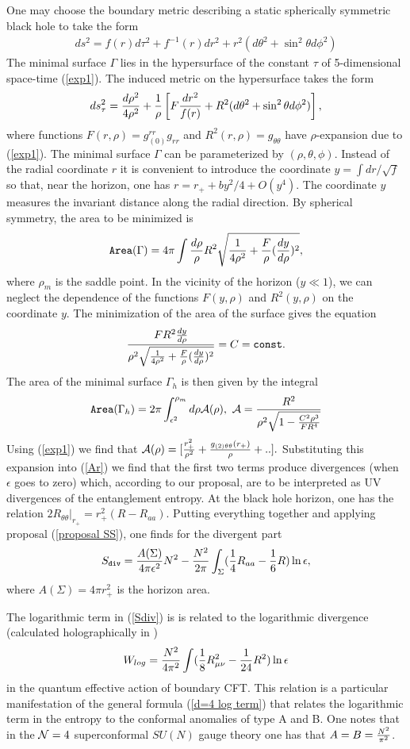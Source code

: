 \documentclass[12pt]{article}
\def\r{\rho}
\def\be{\begin{eqnarray}}
\def\ee{\end{eqnarray}}
\def\lb{\label}
\def\o{\over}
\begin{document}
One may choose the
boundary metric  describing
 a static spherically symmetric black hole to take the form
\be ds^2=f(r)d\tau^2+f^{-1}(r)dr^2+r^2(d\theta^2+\sin^2\theta
d\phi^2) \lb{spher} 
\ee 
The minimal surface $\Gamma$ lies in the
hypersurface of the constant $\tau$ of 5-dimensional space-time
(\ref{exp1}).
 The induced metric on the hypersurface takes the form
\be ds^2_{\tau}={d\r^2\over 4\r^2}+{1\over \r}\left[F{dr^2\over
f(r)} +R^2(d\theta^2+\sin^2\theta d\phi^2)\right], \lb{hyper} 
\ee
where functions $F(r,\rho)=g^{rr}_{(0)}g_{rr}$ and
$R^2(r,\rho)=g_{\theta\theta}$ have $\rho$-expansion due to
(\ref{exp1}). The minimal surface $\Gamma$ can be parameterized by
$(\rho, \theta, \phi)$. Instead of the radial coordinate $r$ it is
convenient to introduce the coordinate $y=\int dr/\sqrt{f}$ so that,
near the horizon, one has $r=r_++by^2/4+O(y^4)$. The coordinate $y$ measures the
invariant distance along the radial direction. By spherical
symmetry, the area to be minimized is 
\be {\tt Area}(\Gamma)=4\pi
\int {d\r \over \r}R^2 \sqrt{{1\over 4\r^2}+{F\over \r} ({dy\over
d\r})^2}, \lb{*} 
\ee 
where $\r_m$ is  the saddle
point. In the  vicinity of the horizon ($y\ll 1$), we can
neglect the dependence of the functions $F(y,\r)$ and $R^2(y,\rho)$ on the 
coordinate $y$. The minimization of the area of the surface gives
the equation 
\be {FR^2{dy\over d\r}\over \r^2\sqrt{{1\over
4\r^2}+{F\over \r} ({dy\over d\r})^2}}=C={\tt const}. \lb{**} 
\ee
The area of the minimal surface $\Gamma_h$  is then given by the
integral 
\be {\tt Area}(\Gamma_h)=2\pi
\int_{\epsilon^2}^{\r_m}d\r{\cal A} (\r),~{\cal A} ={R^2\over
\r^2\sqrt{1-{C^2\r^3\over FR^4}}} \lb{Ar} 
\ee 
Using (\ref{exp1})
we find that $ {\cal A} (\r)=[{r^2_+\over
\r^2}+{g_{(2)\theta\theta}(r_+)\over \r}+..]. $ Substituting this
expansion into (\ref{Ar}) we find that the first two terms produce
divergences (when $\epsilon$ goes to zero)  which, according to
our proposal, are to be interpreted as UV divergences of the
entanglement entropy. At the black hole horizon, one has the
relation $2R_{\theta\theta}|_{r_+}=r_+^2(R-R_{aa})$. Putting
everything together and applying  proposal (\ref{proposal SS}), one finds for the divergent part 
\be S_{\tt div}={A(\Sigma)\over 4\pi
\epsilon^2}N^2-{N^2\over 2\pi}\int_\Sigma({1\over 4}R_{aa}-{1\over
6}R)\ln\epsilon, \lb{Sdiv} 
\ee 
where $A(\Sigma)=4\pi r_+^2$ is the
horizon area.


The logarithmic term in (\ref{Sdiv}) is 
is related to the logarithmic  divergence (calculated holographically in  \cite{Henningson:1998gx})
$$
W_{log}={N^2\over 4\pi^2}\int ({1\over 8}R^2_{\mu\nu} -{1\over
24}R^2) \ln\epsilon$$
  in the quantum effective action of boundary
CFT. This relation is a particular manifestation of the general
formula (\ref{d=4 log term}) that relates the logarithmic term in the entropy to the conformal anomalies of type A and B. One notes that  in the ${\cal N}=4$ superconformal $SU(N)$ gauge theory 
one has that $A=B={N^2\o \pi^2}$.
\end{document}
